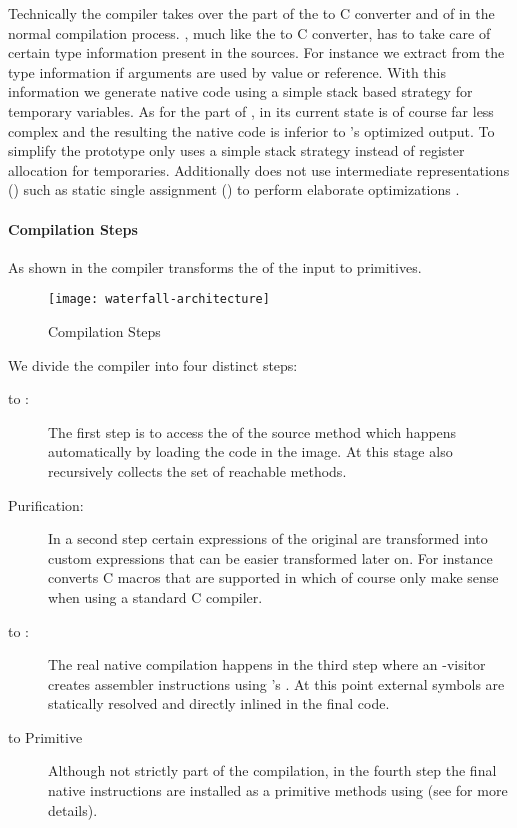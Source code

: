 Technically the \WF compiler takes over the part of the \Slang to C converter and of \GCC in the normal \VM compilation process.
\WF, much like the \Slang to C converter, has to take care of certain type information present in the \Slang sources.
For instance we extract from the type information if arguments are used by value or reference.
With this information we generate native code using a simple stack based strategy for temporary variables.
As for the part of \GCC, \WF in its current state is of course far less complex and the resulting the native code is inferior to \GCC's optimized output.
To simplify the prototype \WF only uses a simple stack strategy instead of register allocation for temporaries.
Additionally \WF does not use intermediate representations (\IR) such as static single assignment (\SSA) to perform elaborate optimizations \cite[Ch.\ 1]{Appe98a}.


\paragraph{Compilation Steps}
As shown in  the \WF compiler transforms the \AST of the \Slang input to \PH primitives.

\begin{figure}[h]
	\centering
	\texttt{[image: waterfall-architecture]}
	\caption{\WF Compilation Steps}
\end{figure}

\noindent We divide the \WF compiler into four distinct steps:
\begin{description}
\item[\Slang to \AST:] The first step is to access the \AST of the \Slang source method which happens automatically by loading the \Slang code in the \PH image.
At this stage \WF also recursively collects the set of reachable \Slang methods.


\item[\AST Purification:] In a second step certain expressions of the original \Slang \AST are transformed into custom \WF expressions that can be easier transformed later on.
For instance \WF converts C macros that are supported in \Slang which of course only make sense when using a standard C compiler.

\item[\AST to \ASM:] The real native compilation happens in the third step where an \AST-visitor creates assembler instructions using \B's \AsmJIT.
At this point external symbols are statically resolved and directly inlined in the final \ASM code.

\item[\ASM to Primitive] Although not strictly part of the compilation, in the fourth step the final native instructions are installed as a primitive methods using \B (see  for more details).
\end{description}


